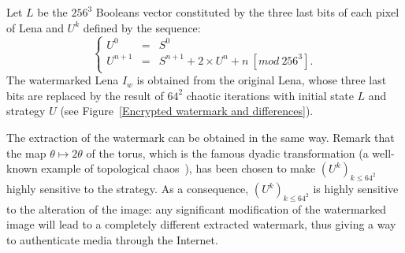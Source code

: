 \documentclass[journal]{IEEEtran}
\begin{document}
Let $L$ be the $256^3$ Booleans vector constituted by the three last bits of each pixel of Lena and $U^k$ defined by the sequence:
\begin{equation}
\left\{
\begin{array}{lll}
U^{0} & = & S^{0} \\
U^{n+1} & = & S^{n+1}+2\times U^{n}+n ~ [mod ~ 256^3].\end{array}\right.
\end{equation}
The watermarked Lena $I_w$ is obtained from the original Lena, whose three last bits are replaced by the result of $64^2$ chaotic iterations with initial state $L$ and strategy $U$ (see Figure~\ref{Encrypted watermark and differences}).

The extraction of the watermark can be obtained in the same way. Remark that the map $\theta \mapsto 2\theta $ of the torus, which is the famous dyadic transformation (a well-known example of topological chaos~\cite{Dev89}), has been chosen to make $(U^{k})_{k \leqslant 64^2}$ highly sensitive to the strategy. As a consequence, $(U^{k})_{k \leqslant 64^2}$ is highly sensitive to the alteration of the image: any significant modification of the watermarked image will lead to a completely different extracted watermark, thus giving a way to authenticate media through the Internet.
\end{document}
